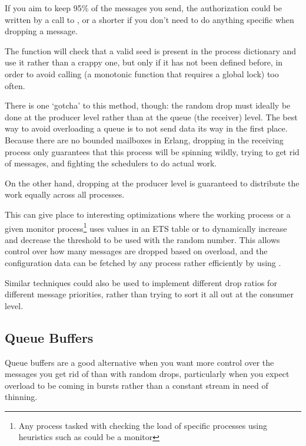 
If you aim to keep 95\% of the messages you send, the authorization could be written by a call to , or a shorter  if you don't need to do anything specific when dropping a message.

The  function will check that a valid seed is present in the process dictionary and use it rather than a crappy one, but only if it has not been defined before, in order to avoid calling  (a monotonic function that requires a global lock) too often.

There is one `gotcha' to this method, though: the random drop must ideally be done at the producer level rather than at the queue (the receiver) level. The best way to avoid overloading a queue is to not send data its way in the first place. Because there are no bounded mailboxes in Erlang, dropping in the receiving process only guarantees that this process will be spinning wildly, trying to get rid of messages, and fighting the schedulers to do actual work.

On the other hand, dropping at the producer level is guaranteed to distribute the work equally across all processes.

This can give place to interesting optimizations where the working process or a given monitor process\footnote{Any process tasked with checking the load of specific processes using heuristics such as  could be a monitor} uses values in an ETS table or  to dynamically increase and decrease the threshold to be used with the random number. This allows control over how many messages are dropped based on overload, and the configuration data can be fetched by any process rather efficiently by using .

Similar techniques could also be used to implement different drop ratios for different message priorities, rather than trying to sort it all out at the consumer level.

\subsection{Queue Buffers}

Queue buffers are a good alternative when you want more control over the messages you get rid of than with random drops, particularly when you expect overload to be coming in bursts rather than a constant stream in need of thinning.

